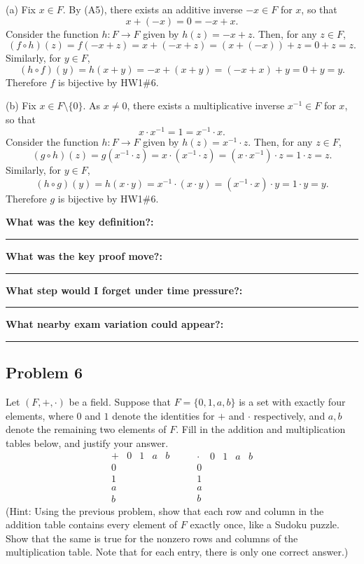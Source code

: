 \documentclass[12pt]{article}
\newcommand{\writespace}[1]{\vspace*{#1}}
\newcommand{\fillfieldbig}[2]{%
  \par\noindent\textbf{#1:}\par
  \writespace{#2}
  \noindent\rule{\linewidth}{0.35pt}\par\vspace{0.15in}%
}
\newenvironment{problemstatementbox}[1]{%
  \begin{tcolorbox}[
    enhanced,
    breakable,
    colback=probblue,
    colframe=blue!55!black,
    fonttitle=\bfseries,
    title={Problem Statement\hfill #1}
  ]
}{%
  \end{tcolorbox}
}
\newenvironment{solutionbox}[1]{%
  \begin{tcolorbox}[
    enhanced,
    breakable,
    colback=solgreen,
    colframe=green!45!black,
    fonttitle=\bfseries,
    title={#1}
  ]
}{%
  \end{tcolorbox}
}
\newcommand{\reflectionpage}[1]{%
  \begin{tcolorbox}[
    enhanced,
    colback=reflectcyan,
    colframe=cyan!55!black,
    fonttitle=\bfseries,
    title={Reflection \& Variation\hfill #1},
    height=8.45in
  ]
  \fillfieldbig{What was the key definition?}{1.15in}
  \fillfieldbig{What was the key proof move?}{1.15in}
  \fillfieldbig{What step would I forget under time pressure?}{1.15in}
  \fillfieldbig{What nearby exam variation could appear?}{1.35in}
  \end{tcolorbox}
}
\begin{document}
\newpage
\begin{solutionbox}{Official Solution (Professor)}
(a) Fix \(x\in F\). By (A5), there exists an additive inverse \(-x\in F\) for \(x\), so that
\[
  x+(-x)=0=-x+x.
\]
Consider the function \(h:F\to F\) given by \(h(z)=-x+z\). Then, for any \(z\in F\),
\[
  (f\circ h)(z)=f(-x+z)=x+(-x+z)
  =
  (x+(-x))+z
  =
  0+z
  =
  z.
\]
Similarly, for \(y\in F\),
\[
  (h\circ f)(y)=h(x+y)=-x+(x+y)
  =
  (-x+x)+y
  =
  0+y
  =
  y.
\]
Therefore \(f\) is bijective by HW1\#6.

(b) Fix \(x\in F\setminus\{0\}\). As \(x\neq0\), there exists a multiplicative inverse \(x^{-1}\in F\) for \(x\), so that
\[
  x\cdot x^{-1}=1=x^{-1}\cdot x.
\]
Consider the function \(h:F\to F\) given by \(h(z)=x^{-1}\cdot z\). Then, for any \(z\in F\),
\[
  (g\circ h)(z)=g(x^{-1}\cdot z)=x\cdot(x^{-1}\cdot z)
  =
  (x\cdot x^{-1})\cdot z
  =
  1\cdot z
  =
  z.
\]
Similarly, for \(y\in F\),
\[
  (h\circ g)(y)=h(x\cdot y)=x^{-1}\cdot(x\cdot y)
  =
  (x^{-1}\cdot x)\cdot y
  =
  1\cdot y
  =
  y.
\]
Therefore \(g\) is bijective by HW1\#6.
\end{solutionbox}

\newpage
\reflectionpage{Homework 2, Problem 5}

\newpage
\subsection{Problem 6}

\begin{problemstatementbox}{Homework 2, Problem 6}
Let \((F,+,\cdot)\) be a field. Suppose that \(F=\{0,1,a,b\}\) is a set with exactly four elements, where \(0\) and \(1\) denote the identities for \(+\) and \(\cdot\) respectively, and \(a,b\) denote the remaining two elements of \(F\). Fill in the addition and multiplication tables below, and justify your answer.
\[
\begin{array}{c|cccc}
+&0&1&a&b\\ \hline
0&&&&\\
1&&&&\\
a&&&&\\
b&&&&
\end{array}
\qquad
\begin{array}{c|cccc}
\cdot&0&1&a&b\\ \hline
0&&&&\\
1&&&&\\
a&&&&\\
b&&&&
\end{array}
\]
(Hint: Using the previous problem, show that each row and column in the addition table contains every element of \(F\) exactly once, like a Sudoku puzzle. Show that the same is true for the nonzero rows and columns of the multiplication table. Note that for each entry, there is only one correct answer.)
\end{problemstatementbox}
\end{document}
